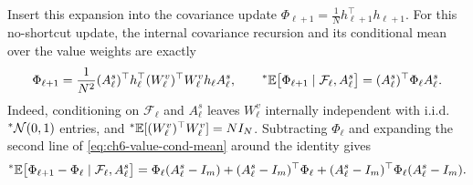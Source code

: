 \begin{proofsketch}
Insert this expansion into the covariance update $\Phi_{\ell+1} = \frac{1}{N} h_{\ell+1}^\top h_{\ell+1}$. For this no-shortcut update, the internal covariance recursion and its conditional mean over the value weights are exactly
\begin{equation}
\label{eq:ch6-value-cond-mean}
\Phi_{\ell+1} = \frac{1}{N^2} (A_\ell^s)^\top h_\ell^\top (W_\ell^v)^\top W_\ell^v h_\ell A_\ell^s, \qquad
{}^*\mathbb{E}\bigl[\Phi_{\ell+1} \mid \mathcal{F}_\ell, A_\ell^s\bigr] = (A_\ell^s)^\top \Phi_\ell A_\ell^s.
\end{equation}
Indeed, conditioning on $\mathcal{F}_\ell$ and $A_\ell^s$ leaves $W_\ell^v$ internally independent with i.i.d.\ ${}^*\mathcal{N}(0, 1)$ entries, and ${}^*\mathbb{E}[(W_\ell^v)^\top W_\ell^v] = N I_N$. Subtracting $\Phi_\ell$ and expanding the second line of \eqref{eq:ch6-value-cond-mean} around the identity gives
\begin{equation}
\label{eq:ch6-value-mean-expand}
{}^*\mathbb{E}\bigl[\Phi_{\ell+1} - \Phi_\ell \mid \mathcal{F}_\ell, A_\ell^s\bigr]
= \Phi_\ell(A_\ell^s - I_m) + (A_\ell^s - I_m)^\top \Phi_\ell + (A_\ell^s - I_m)^\top \Phi_\ell (A_\ell^s - I_m).
\end{equation}


\end{proofsketch}
